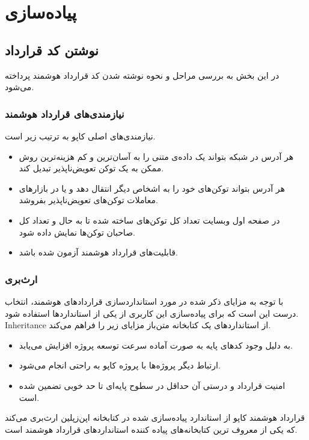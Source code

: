 \chapter{پیاده‌سازی}

\section{نوشتن کد قرارداد}
در این بخش به بررسی مراحل و نحوه نوشته شدن کد قرارداد هوشمند پرداخته می‌شود.

\subsection{نیازمندی‌های قرارداد هوشمند}
نیازمندی‌های اصلی کاپو به ترتیب زیر است.
\begin{itemize}
  \item
هر آدرس در شبکه بتواند یک داده‌ی متنی را به آسان‌ترین و کم هزینه‌ترین روش ممکن به یک توکن تعویض‌ناپذیر تبدیل کند.
  \item
هر آدرس بتواند توکن‌های خود را به اشخاص دیگر انتقال دهد و یا در بازارهای معاملات توکن‌های تعویض‌ناپذیر بفروشد.
  \item
در صفحه اول وبسایت تعداد کل توکن‌های ساخته شده تا به حال و تعداد کل صاحبان توکن‌ها نمایش داده شود.
  \item
قابلیت‌های قرارداد هوشمند آزمون شده باشد.
\end{itemize}

\subsection{ارث‌بری}
با توجه به مزایای ذکر شده در مورد استانداردسازی قراردادهای هوشمند،
انتخاب درست این است که برای پیاده‌سازی این کاربری از یکی از استانداردها استفاده شود.
\gls{Inheritance}
از استانداردهای یک کتابخانه متن‌باز مزایای زیر را فراهم می‌کند.
\begin{itemize}
  \item
به دلیل وجود کدهای پایه به صورت آماده سرعت توسعه پروژه افزایش می‌یابد.
  \item
ارتباط دیگر پروژه‌ها با پروژه کاپو به راحتی انجام می‌شود.
  \item
امنیت قرارداد و درستی آن حداقل در سطوح پایه‌ای تا حد خوبی تضمین شده است.
\end{itemize}

قرارداد هوشمند کاپو از استاندارد
پیاده‌سازی شده در کتابخانه اپن‌زپلین
ارث‌بری می‌کند که یکی از معروف ترین کتابخانه‌های پیاده کننده استانداردهای قرارداد هوشمند است.

